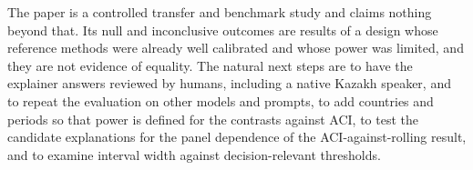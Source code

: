 The paper is a controlled transfer and benchmark study and claims nothing beyond that. Its null and inconclusive outcomes are results of a design whose reference methods were already well calibrated and whose power was limited, and they are not evidence of equality. The natural next steps are to have the explainer answers reviewed by humans, including a native Kazakh speaker, and to repeat the evaluation on other models and prompts, to add countries and periods so that power is defined for the contrasts against ACI, to test the candidate explanations for the panel dependence of the ACI-against-rolling result, and to examine interval width against decision-relevant thresholds.

